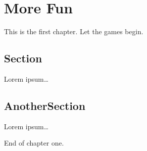 \chapter{More Fun}\label{sec:chapter2}

This is the first chapter. Let the games begin.

\section{Section}

Lorem ipsum\dots

\section{AnotherSection}

Lorem ipsum\dots

End of chapter one.
